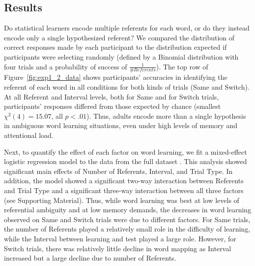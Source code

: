 \documentclass{pnastwo}
\begin{document}
\begin{article}
\subsection{Results}

Do statistical learners encode multiple referents for each word, or do they instead encode only a single hypothesized referent? We compared the distribution of correct responses made by each participant to the distribution expected if participants were selecting randomly (defined by a Binomial distribution with four trials and a probability of success of  $\frac{1}{\#Referents}$). The top row of Figure~\ref{fig:exp1_2_data} shows participants' accuracies in identifying the referent of each word in all conditions for both kinds of trials (Same and Switch). At all Referent and Interval levels, both for Same and for Switch trials, participants' responses differed from those expected by chance (smallest $\chi^{2}(4) = 15.07$, all $p < .01$). Thus, adults encode more than a single hypothesis in ambiguous word learning situations, even under high levels of memory and attentional load. 

Next, to quantify the effect of each factor on word learning, we fit a mixed-effect logistic regression model to the data from the full dataset \cite{Baayen2008}. This analysis showed significant main effects of Number of Referents, Interval, and Trial Type. In addition, the model showed a significant two-way interaction between Referents and Trial Type and a significant three-way interaction between all three factors (see Supporting Material). Thus, while word learning was best at low levels of referential ambiguity and at low memory demands, the decreases in word learning observed on Same and Switch trials were due to different factors. For Same trials, the number of Referents played a relatively small role in the difficulty of learning, while the Interval between learning and test played a large role. However, for Switch trials, there was relatively little decline in word mapping as Interval increased but a large decline due to number of Referents. 


\end{article}
\end{document}
